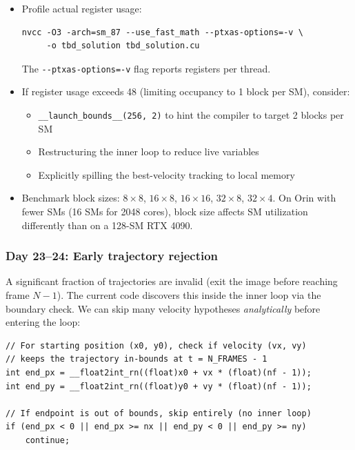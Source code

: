 \documentclass[11pt,letterpaper]{article}
\begin{document}
\begin{itemize}[leftmargin=2em]
    \item Profile actual register usage:
\begin{lstlisting}[style=bashstyle]
nvcc -O3 -arch=sm_87 --use_fast_math --ptxas-options=-v \
     -o tbd_solution tbd_solution.cu
\end{lstlisting}
    The \texttt{-{}-ptxas-options=-v} flag reports registers per thread.

    \item If register usage exceeds 48 (limiting occupancy to 1 block per
    SM), consider:
    \begin{itemize}
        \item \texttt{\_\_launch\_bounds\_\_(256, 2)} to hint the compiler
        to target 2 blocks per SM
        \item Restructuring the inner loop to reduce live variables
        \item Explicitly spilling the best-velocity tracking to local memory
    \end{itemize}

    \item Benchmark block sizes: $8 \times 8$, $16 \times 8$,
    $16 \times 16$, $32 \times 8$, $32 \times 4$. On Orin with fewer SMs
    (16 SMs for 2048 cores), block size affects SM utilization differently
    than on a 128-SM RTX 4090.
\end{itemize}

\subsubsection{Day 23--24: Early trajectory rejection}

A significant fraction of trajectories are invalid (exit the image
before reaching frame $N-1$). The current code discovers this inside the
inner loop via the boundary check. We can skip many velocity hypotheses
\emph{analytically} before entering the loop:

\begin{lstlisting}[style=cudastyle]
// For starting position (x0, y0), check if velocity (vx, vy)
// keeps the trajectory in-bounds at t = N_FRAMES - 1
int end_px = __float2int_rn((float)x0 + vx * (float)(nf - 1));
int end_py = __float2int_rn((float)y0 + vy * (float)(nf - 1));

// If endpoint is out of bounds, skip entirely (no inner loop)
if (end_px < 0 || end_px >= nx || end_py < 0 || end_py >= ny)
    continue;
\end{lstlisting}
\end{document}

